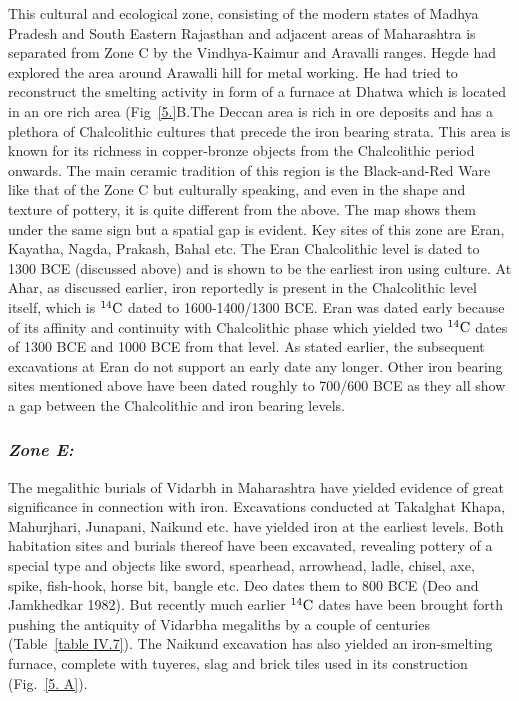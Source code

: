 This cultural and ecological zone, consisting of the modern states of Madhya Pradesh and South Eastern Rajasthan and adjacent areas of Maharashtra is separated from Zone C by the Vindhya-Kaimur and Aravalli ranges. Hegde had explored the area around Arawalli hill for metal working. He had tried to reconstruct the smelting activity in form of a furnace at Dhatwa which is located in an ore rich area (Fig~\ref{5.}B.The Deccan area is rich in ore deposits and has a plethora of Chalcolithic cultures that precede the iron bearing strata. This area is known for its richness in copper-bronze objects from the Chalcolithic period onwards. The main ceramic tradition of this region is the Black-and-Red Ware like that of the Zone C but culturally speaking, and even in the shape and texture of pottery, it is quite different from the above. The map shows them under the same sign but a spatial gap is evident. Key sites of this zone are Eran, Kayatha, Nagda, Prakash, Bahal etc. The Eran Chalcolithic level is dated to 1300 BCE (discussed above) and is shown to be the earliest iron using culture. At Ahar, as discussed earlier, iron reportedly is present in the Chalcolithic level itself, which is $^{14}{\rm C}$ dated to 1600-1400/1300 BCE.  Eran was dated early because of its affinity and continuity with Chalcolithic phase which yielded two $^{14}{\rm C}$ dates of 1300 BCE and 1000 BCE from that level. As stated earlier, the subsequent excavations at Eran do not support an early date any longer. Other iron bearing sites mentioned above have been dated roughly to 700/600 BCE as they all show a gap between the Chalcolithic and iron bearing levels.

\vspace{-.3cm}

\subsubsection*{\textit{Zone E:}}

\vspace{-.2cm}

The megalithic burials of Vidarbh in Maharashtra have yielded evidence of great significance in connection with iron. Excavations conducted at Takalghat ­Khapa, Mahurjhari, Junapani, Naikund etc. have yielded iron at the earliest levels. Both habitation sites and burials thereof have been excavated, revealing pottery of a special type and objects like sword, spearhead, arrowhead, ladle, chisel, axe, spike, fish-hook, horse bit, bangle etc. Deo dates them to 800 BCE (Deo and Jamkhedkar 1982). But recently much earlier $^{14}{\rm C}$ dates have been brought forth pushing the antiquity of Vidarbha megaliths by a couple of centuries (Table~\ref{table IV.7}). The Naikund excavation has also yielded an iron-smelting furnace, complete with tuyeres, slag and brick tiles used in its construction (Fig.~\ref{5. A}).

